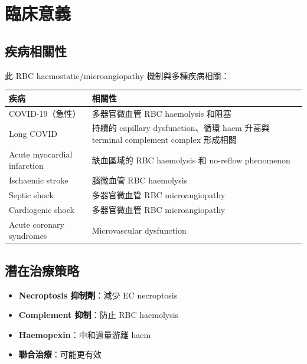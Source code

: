 \documentclass[12pt,a4paper]{article}
\begin{document}
\section{臨床意義}

\subsection{疾病相關性}

此 RBC haemostatic/microangiopathy 機制與多種疾病相關：

\begin{longtable}{p{5cm}p{9cm}}
\toprule
\textbf{疾病} & \textbf{相關性} \\
\midrule
\endhead
COVID-19（急性） & 多器官微血管 RBC haemolysis 和阻塞 \\
Long COVID & 持續的 capillary dysfunction、循環 haem 升高與 terminal complement complex 形成相關 \\
Acute myocardial infarction & 缺血區域的 RBC haemolysis 和 no-reflow phenomenon \\
Ischaemic stroke & 腦微血管 RBC haemolysis \\
Septic shock & 多器官微血管 RBC microangiopathy \\
Cardiogenic shock & 多器官微血管 RBC microangiopathy \\
Acute coronary syndromes & Microvascular dysfunction \\
\bottomrule
\end{longtable}

\subsection{潛在治療策略}

\begin{itemize}
    \item \textbf{Necroptosis 抑制劑}：減少 EC necroptosis
    \item \textbf{Complement 抑制}：防止 RBC haemolysis
    \item \textbf{Haemopexin}：中和過量游離 haem
    \item \textbf{聯合治療}：可能更有效
\end{itemize}

\end{document}

